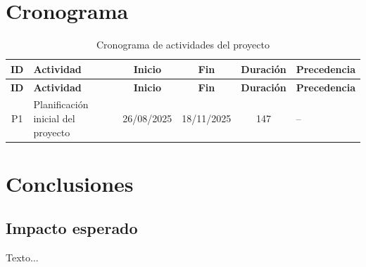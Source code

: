 \documentclass[12pt,spanish]{report}
\begin{document}
	\chapter{Cronograma}
	
	\begin{longtable}{c p{6cm} c c c p{3cm}}
		\caption{Cronograma de actividades del proyecto}\\
		\toprule
		\textbf{ID} & \textbf{Actividad} & \textbf{Inicio} & \textbf{Fin} & \textbf{Duración} & \textbf{Precedencia} \\
		\midrule
		\endfirsthead
		
		\toprule
		\textbf{ID} & \textbf{Actividad} & \textbf{Inicio} & \textbf{Fin} & \textbf{Duración} & \textbf{Precedencia} \\
		\midrule
		\endhead
		
		P1 & Planificación inicial del proyecto & 26/08/2025 & 18/11/2025 & 147 & -- \\
		\bottomrule
	\end{longtable}
	\chapter{Conclusiones}
	
	\section{Impacto esperado}
	Texto...
	
\end{document}
